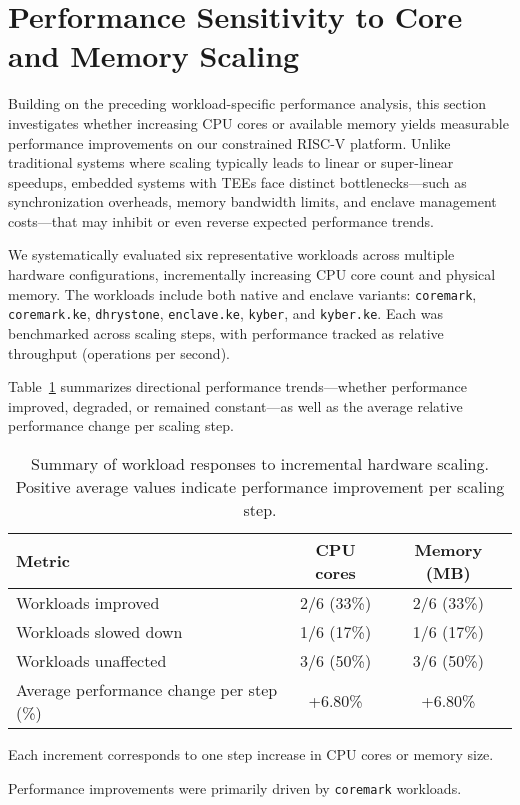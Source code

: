 \section{Performance Sensitivity to Core and Memory Scaling}
\label{sec:hardware-impact}

Building on the preceding workload-specific performance analysis, this section investigates whether increasing CPU cores or available memory yields measurable performance improvements on our constrained RISC-V platform. Unlike traditional systems where scaling typically leads to linear or super-linear speedups, embedded systems with TEEs face distinct bottlenecks—such as synchronization overheads, memory bandwidth limits, and enclave management costs—that may inhibit or even reverse expected performance trends.

We systematically evaluated six representative workloads across multiple hardware configurations, incrementally increasing CPU core count and physical memory. The workloads include both native and enclave variants: \texttt{coremark}, \texttt{coremark.ke}, \texttt{dhrystone}, \texttt{enclave.ke}, \texttt{kyber}, and \texttt{kyber.ke}. Each was benchmarked across scaling steps, with performance tracked as relative throughput (operations per second).

Table~\ref{tab:hardware-impact} summarizes directional performance trends—whether performance improved, degraded, or remained constant—as well as the average relative performance change per scaling step.

\begin{table}[htbp]
\centering
\begin{threeparttable}
\caption{Summary of workload responses to incremental hardware scaling. Positive average values indicate performance improvement per scaling step.}
\label{tab:hardware-impact}
\begin{tabular}{@{}lcc@{}}
\toprule
\textbf{Metric} & \textbf{CPU cores} & \textbf{Memory (MB)} \\
\midrule
Workloads improved                      & 2/6 (33\%) & 2/6 (33\%) \\
Workloads slowed down                   & 1/6 (17\%) & 1/6 (17\%) \\
Workloads unaffected                    & 3/6 (50\%) & 3/6 (50\%) \\
Average performance change per step (\%)& +6.80\%    & +6.80\%    \\
\bottomrule
\end{tabular}
\begin{tablenotes}
\footnotesize
\item Each increment corresponds to one step increase in CPU cores or memory size.
\item Performance improvements were primarily driven by \texttt{coremark} workloads.
\end{tablenotes}
\end{threeparttable}
\end{table}

